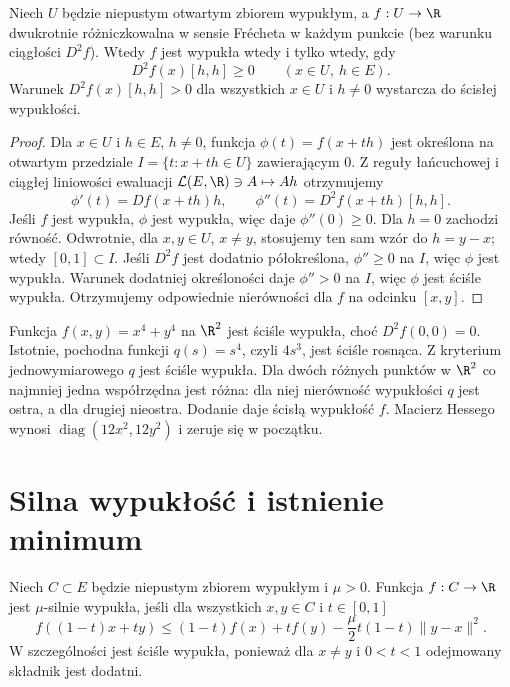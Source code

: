 \begin{twierdzenie}
\label{ma2:thm:convex-second-order}
Niech $U$ będzie niepustym otwartym zbiorem wypukłym,
a $f:U\to\R$ dwukrotnie różniczkowalna w sensie
Frécheta w każdym punkcie (bez warunku ciągłości $D^2f$).
Wtedy $f$ jest wypukła wtedy i tylko wtedy, gdy
\[
 D^2f(x)[h,h]\ge0\qquad (x\in U,\ h\in E).
\]
Warunek $D^2f(x)[h,h]>0$ dla wszystkich $x\in U$
i $h\ne0$ wystarcza do ścisłej wypukłości.
\end{twierdzenie}
\begin{proof}
Dla $x\in U$ i $h\in E$, $h\ne0$, funkcja
$\phi(t)=f(x+th)$ jest określona na otwartym
przedziale $I=\{t:x+th\in U\}$ zawierającym $0$.
Z reguły łańcuchowej i ciągłej liniowości ewaluacji
$\mathcal L(E,\R)\ni A\mapsto Ah$ otrzymujemy
\[
 \phi'(t)=Df(x+th)h,\qquad
 \phi''(t)=D^2f(x+th)[h,h].
\]
Jeśli $f$ jest wypukła, $\phi$ jest wypukła, więc
daje $\phi''(0)\ge0$. Dla $h=0$ zachodzi równość.
Odwrotnie, dla $x,y\in U$, $x\ne y$, stosujemy
ten sam wzór do $h=y-x$; wtedy $[0,1]\subset I$.
Jeśli $D^2f$ jest dodatnio półokreślona, $\phi''\ge0$
na $I$, więc $\phi$ jest wypukła. Warunek dodatniej
określoności daje $\phi''>0$ na $I$, więc $\phi$
jest ściśle wypukła. Otrzymujemy odpowiednie nierówności
dla $f$ na odcinku $[x,y]$.
\end{proof}

\begin{przyklad}
\label{ma2:ex:strict-convex-flat-hessian}
Funkcja $f(x,y)=x^4+y^4$ na $\R^2$ jest ściśle
wypukła, choć $D^2f(0,0)=0$.
Istotnie, pochodna funkcji $q(s)=s^4$, czyli $4s^3$,
jest ściśle rosnąca. Z kryterium jednowymiarowego
$q$ jest ściśle wypukła.
Dla dwóch różnych punktów w $\R^2$ co najmniej
jedna współrzędna jest różna: dla niej nierówność
wypukłości $q$ jest ostra, a dla drugiej nieostra.
Dodanie daje ścisłą wypukłość $f$.
Macierz Hessego wynosi $\operatorname{diag}(12x^2,12y^2)$
i zeruje się w początku.
\end{przyklad}

\section{Silna wypukłość i istnienie minimum}

\begin{definicja}
\label{ma2:def:strong-convexity}
Niech $C\subset E$ będzie niepustym zbiorem wypukłym
i $\mu>0$. Funkcja $f:C\to\R$ jest $\mu$-silnie wypukła,
jeśli dla wszystkich $x,y\in C$ i $t\in[0,1]$
\[
 f((1-t)x+ty)
 \le(1-t)f(x)+tf(y)-\frac{\mu}{2}t(1-t)\|y-x\|^2.
\]
W szczególności jest ściśle wypukła, ponieważ
dla $x\ne y$ i $0<t<1$ odejmowany składnik jest dodatni.
\end{definicja}

